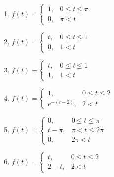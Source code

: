 \begin{multicols}{2}
	\begin{enumerate}
		\item $ f(t) = \begin{cases} 1,  & 0 \le t \le \pi \\ 0, & \pi < t \end{cases}$\\
		\item $ f(t) = \begin{cases} t,  & 0 \le t \le 1 \\ 0, & 1 < t \end{cases}$\\
		\item $ f(t) = \begin{cases} t,  & 0 \le t \le 1 \\ 1, & 1 < t \end{cases}$\\
		\item $ f(t) = \begin{cases} 1,  & 0 \le t \le 2 \\ e^{-(t-2)}, & 2 < t \end{cases}$\\
		\item $ f(t) = \begin{cases} 0,  & 0 \le t \le \pi \\t - \pi,  & \pi < t \le 2 \pi \\ 0, & 2 \pi < t \end{cases}$\\
		\item $ f(t) = \begin{cases} t,  & 0 \le t \le 2 \\ 2-t, & 2 < t \end{cases}$\\
	\end{enumerate}
\end{multicols}
\vspace{1em}



